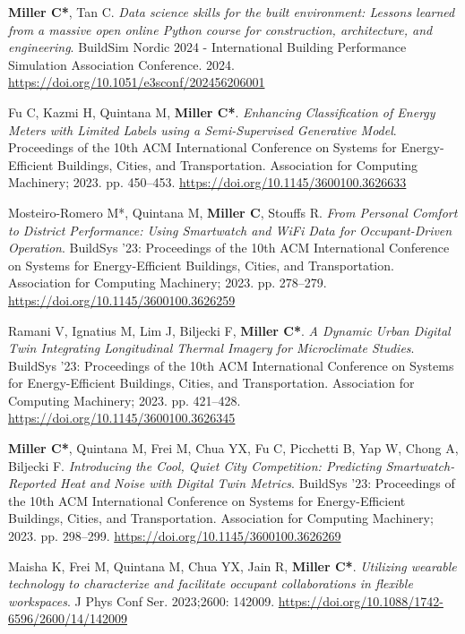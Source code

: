 \documentclass[10pt,a4paper]{article}
\begin{document}
\begin{small}
\begin{etaremune}
\item
\textbf{Miller C*}, Tan C.  \emph{Data science skills for the built environment: Lessons learned from a massive open online Python course for construction, architecture, and engineering}. BuildSim Nordic 2024 - International Building Performance Simulation Association Conference. 2024. \url{https://doi.org/10.1051/e3sconf/202456206001}
\item
Fu C, Kazmi H, Quintana M, \textbf{Miller C*}. \emph{Enhancing Classification of Energy Meters with Limited Labels using a Semi-Supervised Generative Model}. Proceedings of the 10th ACM International Conference on Systems for Energy-Efficient Buildings, Cities, and Transportation. Association for Computing Machinery; 2023. pp. 450–453. \url{https://doi.org/10.1145/3600100.3626633}
\item
Mosteiro-Romero M*, Quintana M, \textbf{Miller C}, Stouffs R. \emph{From Personal Comfort to District Performance: Using Smartwatch and WiFi Data for Occupant-Driven Operation}. BuildSys '23: Proceedings of the 10th ACM International Conference on Systems for Energy-Efficient Buildings, Cities, and Transportation. Association for Computing Machinery; 2023. pp. 278–279. \url{https://doi.org/10.1145/3600100.3626259}
\item
Ramani V, Ignatius M, Lim J, Biljecki F, \textbf{Miller C*}. \emph{A Dynamic Urban Digital Twin Integrating Longitudinal Thermal Imagery for Microclimate Studies}. BuildSys '23: Proceedings of the 10th ACM International Conference on Systems for Energy-Efficient Buildings, Cities, and Transportation. Association for Computing Machinery; 2023. pp. 421–428. \url{https://doi.org/10.1145/3600100.3626345}
\item
\textbf{Miller C*}, Quintana M, Frei M, Chua YX, Fu C, Picchetti B, Yap W, Chong A, Biljecki F. \emph{Introducing the Cool, Quiet City Competition: Predicting Smartwatch-Reported Heat and Noise with Digital Twin Metrics}. BuildSys '23: Proceedings of the 10th ACM International Conference on Systems for Energy-Efficient Buildings, Cities, and Transportation. Association for Computing Machinery; 2023. pp. 298–299. \url{https://doi.org/10.1145/3600100.3626269}
\item
Maisha K, Frei M, Quintana M, Chua YX, Jain R, \textbf{Miller C*}. \emph{Utilizing wearable technology to characterize and facilitate occupant collaborations in flexible workspaces}. J Phys Conf Ser. 2023;2600: 142009. \url{https://doi.org/10.1088/1742-6596/2600/14/142009}
\item

\end{etaremune}
\end{small}
\end{document}
